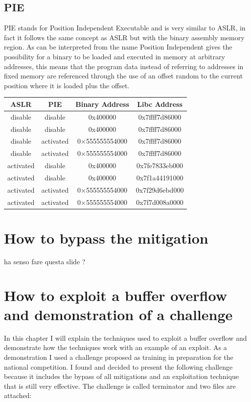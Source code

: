\documentclass{report}
\begin{document}
    \subsection{PIE}
    PIE stands for Position Independent Executable and is very similar to ASLR, in fact it follows the same concept as ASLR but with the binary assembly memory region.\newline
    As can be interpreted from the name Position Independent gives the possibility for a binary to be loaded and executed in memory at arbitrary addresses, this means that the program data instead of referring to addresses in fixed memory are referenced through the use of an offset random to the current position where it is loaded plus the offset.
    
    \begin{table}[h] %
      \centering
      \begin{tabular}{|c|c|c|c|}
        \hline
        ASLR  & PIE & Binary Address & Libc Address \\
        \hline
        disable & disable  & 0x400000 & 0x7ffff7d86000 \\
        disable & disable  & 0x400000 & 0x7ffff7d86000\\
        disable & activated   & 0×555555554000 & 0x7ffff7d86000 \\
        disable & activated   & 0×555555554000 & 0x7ffff7d86000 \\
        activated  & disable  &  0x400000 & 0x7fe7833eb000 \\
        activated  & disable  &  0x400000& 0x7f1a44191000 \\
        activated  & activated   & 0×555555554000 & 0x7f29d6ebd000 \\
        activated  & activated   & 0×555555554000 & 0x7f7d008a0000 \\
        \hline
      \end{tabular}
    \end{table}
    \clearpage
    \section{How to bypass the mitigation}
    ha senso fare questa slide ?
    \clearpage
    \section{How to exploit a buffer overflow and demonstration of a challenge}
    In this chapter I will explain the techniques used to exploit a buffer overflow and demonstrate how the techniques work with an example of an exploit.\newline
    As a demonstration I used a challenge proposed as training in preparation for the national competition.\newline
    I found and decided to present the following challenge because it includes the bypass of all mitigations and an exploitation technique that is still very effective.\newline
        The challenge is called terminator and two files are attached:
\end{document}
